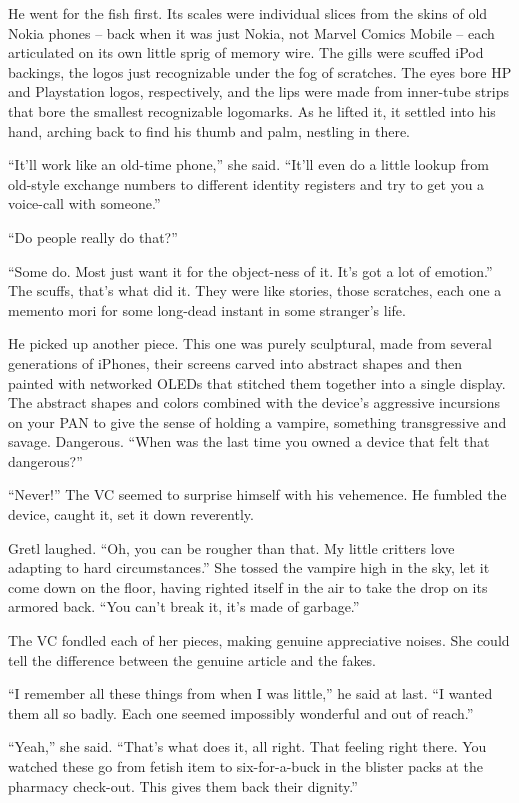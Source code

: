 He went for the fish first. Its scales were individual slices from the 
skins of old Nokia phones -- back when it was just Nokia, not Marvel 
Comics Mobile -- each articulated on its own little sprig of memory 
wire. The gills were scuffed iPod backings, the logos just recognizable 
under the fog of scratches. The eyes bore HP and Playstation logos, 
respectively, and the lips were made from inner-tube strips that bore 
the smallest recognizable logomarks. As he lifted it, it settled into 
his hand, arching back to find his thumb and palm, nestling in there.

“It'll work like an old-time phone,” she said. “It'll even do a 
little lookup from old-style exchange numbers to different identity 
registers and try to get you a voice-call with someone.”

“Do people really do that?”

“Some do. Most just want it for the object-ness of it. It's got a lot 
of emotion.” The scuffs, that's what did it. They were like stories, 
those scratches, each one a memento mori for some long-dead instant in 
some stranger's life.

He picked up another piece. This one was purely sculptural, made from 
several generations of iPhones, their screens carved into abstract 
shapes and then painted with networked OLEDs that stitched them 
together into a single display. The abstract shapes and colors combined 
with the device's aggressive incursions on your PAN to give the sense 
of holding a vampire, something transgressive and savage. Dangerous. 
“When was the last time you owned a device that felt that 
dangerous?”

“Never!” The VC seemed to surprise himself with his vehemence. He 
fumbled the device, caught it, set it down reverently.

Gretl laughed. “Oh, you can be rougher than that. My little critters 
love adapting to hard circumstances.” She tossed the vampire high in 
the sky, let it come down on the floor, having righted itself in the 
air to take the drop on its armored back. “You can't break it, it's 
made of garbage.”

The VC fondled each of her pieces, making genuine appreciative noises. 
She could tell the difference between the genuine article and the fakes.

“I remember all these things from when I was little,” he said at 
last. “I wanted them all so badly. Each one seemed impossibly 
wonderful and out of reach.”

“Yeah,” she said. “That's what does it, all right. That feeling 
right there. You watched these go from fetish item to six-for-a-buck in 
the blister packs at the pharmacy check-out. This gives them back their 
dignity.”

